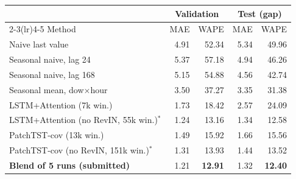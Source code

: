 \begin{tabular}{@{}lrrrr@{}}
\toprule
& \multicolumn{2}{c}{Validation} & \multicolumn{2}{c}{Test (gap)} \\
\cmidrule(lr){2-3}\cmidrule(lr){4-5}
Method & MAE & WAPE & MAE & WAPE \\
\midrule
Naive last value & 4.91 & 52.34 & 5.34 & 49.96 \\
Seasonal naive, lag 24 & 5.37 & 57.18 & 4.94 & 46.26 \\
Seasonal naive, lag 168 & 5.15 & 54.88 & 4.56 & 42.74 \\
Seasonal mean, dow$\times$hour & 3.50 & 37.27 & 3.35 & 31.38 \\
\midrule
LSTM+Attention (7k win.) & 1.73 & 18.42 & 2.57 & 24.09 \\
LSTM+Attention (no RevIN, 55k win.)$^{\ast}$ & 1.24 & 13.16 & 1.34 & 12.58 \\
PatchTST-cov (13k win.) & 1.49 & 15.92 & 1.66 & 15.56 \\
PatchTST-cov (no RevIN, 151k win.)$^{\ast}$ & 1.31 & 13.93 & 1.44 & 13.52 \\
\textbf{Blend of 5 runs (submitted)} & 1.21 & \textbf{12.91} & 1.32 & \textbf{12.40} \\
\bottomrule
\end{tabular}
